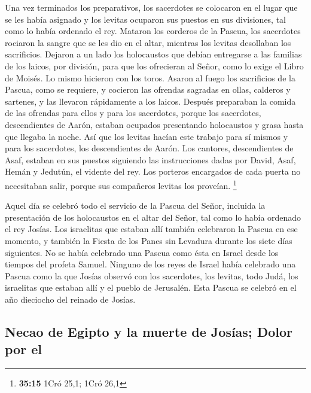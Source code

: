  Una vez terminados los preparativos, los sacerdotes se
colocaron en el lugar que se les había asignado y los levitas ocuparon
sus puestos en sus divisiones, tal como lo había ordenado el rey.
 Mataron los corderos de la Pascua, los sacerdotes
rociaron la sangre que se les dio en el altar, mientras los levitas
desollaban los sacrificios.  Dejaron a un lado los
holocaustos que debían entregarse a las familias de los laicos, por
división, para que los ofrecieran al Señor, como lo exige el Libro de
Moisés. Lo mismo hicieron con los toros.  Asaron al fuego
los sacrificios de la Pascua, como se requiere, y cocieron las ofrendas
sagradas en ollas, calderos y sartenes, y las llevaron rápidamente a los
laicos.  Después preparaban la comida de las ofrendas
para ellos y para los sacerdotes, porque los sacerdotes, descendientes
de Aarón, estaban ocupados presentando holocaustos y grasa hasta que
llegaba la noche. Así que los levitas hacían este trabajo para sí mismos
y para los sacerdotes, los descendientes de Aarón.  Los
cantores, descendientes de Asaf, estaban en sus puestos siguiendo las
instrucciones dadas por David, Asaf, Hemán y Jedutún, el vidente del
rey. Los porteros encargados de cada puerta no necesitaban salir, porque
sus compañeros levitas los proveían. \footnote{\textbf{35:15} 1Cró 25,1;
  1Cró 26,1}

 Aquel día se celebró todo el servicio de la Pascua del
Señor, incluida la presentación de los holocaustos en el altar del
Señor, tal como lo había ordenado el rey Josías.  Los
israelitas que estaban allí también celebraron la Pascua en ese momento,
y también la Fiesta de los Panes sin Levadura durante los siete días
siguientes.  No se había celebrado una Pascua como ésta
en Israel desde los tiempos del profeta Samuel. Ninguno de los reyes de
Israel había celebrado una Pascua como la que Josías observó con los
sacerdotes, los levitas, todo Judá, los israelitas que estaban allí y el
pueblo de Jerusalén.  Esta Pascua se celebró en el año
dieciocho del reinado de Josías.

\hypertarget{necao-de-egipto-y-la-muerte-de-josuxedas-dolor-por-el}{%
\subsection{Necao de Egipto y la muerte de Josías; Dolor por
el}\label{necao-de-egipto-y-la-muerte-de-josuxedas-dolor-por-el}}

